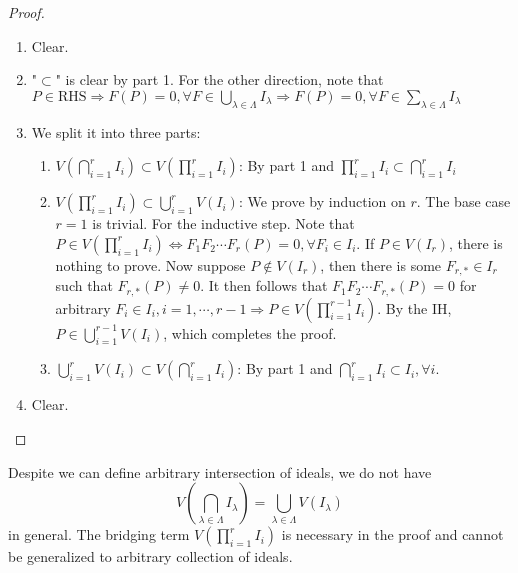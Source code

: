 \documentclass{note-eng}
\begin{document}
\begin{proof}
    \begin{enumerate}
        \item Clear.
        \item "$\subset$" is clear by part 1. For the other direction, note that $P \in \mathrm{RHS} \Rightarrow F(P) = 0, \forall F \in \bigcup\limits_{\lambda \in \Lambda} I_\lambda \Rightarrow F(P) = 0, \forall F \in \sum\limits_{\lambda \in \Lambda} I_\lambda$
        \item We split it into three parts:
        \begin{enumerate}
            \item $V \left(\bigcap\limits_{i = 1}^{r} I_i\right) \subset V \left(\prod\limits_{i = 1}^{r} I_i\right)$: By part 1 and $\prod\limits_{i = 1}^{r} I_i \subset \bigcap\limits_{i = 1}^{r} I_i$
            \item $V \left(\prod\limits_{i = 1}^{r} I_i\right) \subset \bigcup\limits_{i = 1}^{r} V(I_i)$: We prove by induction on $r$. The base case $r = 1$ is trivial. For the inductive step. Note that $P \in V \left(\prod\limits_{i = 1}^{r} I_i\right) \Leftrightarrow F_1F_2 \cdots F_r(P) = 0, \forall F_i \in I_i$. If $P \in V(I_r)$, there is nothing to prove. Now suppose $P \notin V(I_r)$, then there is some $F_{r, \ast} \in I_r$ such that $F_{r, \ast}(P) \ne 0$. It then follows that $F_1F_2 \cdots F_{r, \ast}(P) = 0$ for arbitrary $F_i \in I_i, i = 1, \cdots, r - 1 \Rightarrow P \in V \left(\prod\limits_{i = 1}^{r - 1} I_i\right)$. By the IH, $P \in \bigcup\limits_{i = 1}^{r - 1} V(I_i)$, which completes the proof.
            \item $\bigcup\limits_{i = 1}^{r} V(I_i) \subset V \left(\bigcap\limits_{i = 1}^{r} I_i\right)$: By part 1 and $\bigcap\limits_{i = 1}^{r} I_i \subset I_i, \forall i$.
        \end{enumerate}
        \item Clear.
    \end{enumerate}
\end{proof}

\begin{remark}
    Despite we can define arbitrary intersection of ideals, we do not have
    $$V\left(\bigcap\limits_{\lambda \in \Lambda} I_\lambda\right) = \bigcup\limits_{\lambda \in \Lambda} V(I_\lambda)$$
    in general. The bridging term $V\left(\prod\limits_{i = 1}^{r} I_i\right)$ is necessary in the proof and cannot be generalized to arbitrary collection of ideals.
\end{remark}
\end{document}
